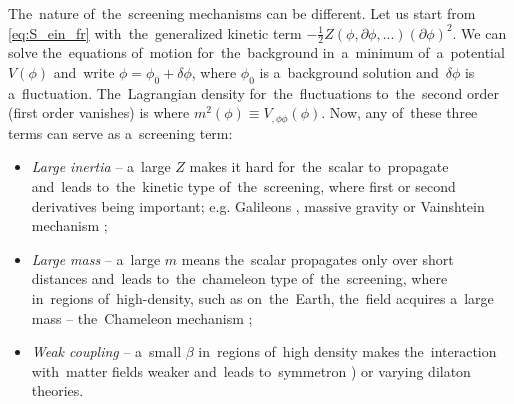 The~nature of~the~screening mechanisms can be different. Let us start from \eqref{eq:S_ein_fr} with~the~generalized kinetic term $-\frac12 Z(\phi,\partial\phi,...)(\partial\phi)^2$. We can solve the~equations of~motion for~the~background in~a~minimum of~a~potential $V(\phi)$ and~write $\phi=\phi_0+\delta\phi$, where $\phi_0$ is a~background solution and~$\delta\phi$ is a~fluctuation. The~Lagrangian density for~the~fluctuations to~the~second order (first order vanishes) is
where $m^2(\phi)\equiv V_{,\phi\phi}(\phi)$. Now, any of~these three terms can serve as a~screening term:
\begin{itemize}
	\item  \textit{Large inertia} -- a~large $Z$ makes it hard for~the~scalar to~propagate and~leads to~the~kinetic type of~the~screening, where first or second derivatives being important; e.g. Galileons \parencite{2009PhRvD..79f4036N}, massive gravity \parencite{2012RvMP...84..671H} or Vainshtein mechanism \parencite{2013CQGra..30r4001B};
	\item \textit{Large mass} --  a~large $m$ means the~scalar propagates only over short distances and~leads to~the~chameleon type of~the~screening, where in~regions of~high-density, such as on~the~Earth, the~field acquires a~large mass -- the~Chameleon mechanism \parencite{Waterhouse:2006wv};
	\item \textit{Weak coupling} -- a~small $\beta$ in~regions of~high density makes the~interaction with~matter fields weaker and~leads to~symmetron \parencite{2010PhRvL.104w1301H}) or varying dilaton \parencite{Damour:1994zq,2011PhRvD..83j4026B} theories.
\end{itemize} 
